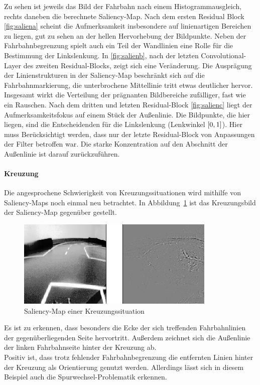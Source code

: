 Zu sehen ist jeweils das Bild der Fahrbahn nach einem Histogrammausgleich, rechts daneben die berechnete Saliency-Map. Nach dem ersten Residual Block \ref{fig:saliena} scheint die Aufmerksamkeit insbesondere auf linienartigen Bereichen zu liegen, gut zu sehen an der hellen Hervorhebung der Bildpunkte. Neben der Fahrbahnbegrenzung spielt auch ein Teil der Wandlinien eine Rolle für die Bestimmung der Linkslenkung. In \ref{fig:salienb}, nach der letzten Convolutional-Layer des zweiten Residual-Blocks, zeigt sich eine Veränderung. Die Ausprägung der Linienstrukturen in der Saliency-Map beschränkt sich auf die Fahrbahnmarkierung, die unterbrochene Mittellinie tritt etwas deutlicher hervor. Insgesamt wirkt die Verteilung der prägnanten Bildbereiche zufälliger, fast wie ein Rauschen.
Nach dem dritten und letzten Residual-Block \ref{fig:salienc} liegt der Aufmerksamkeitsfokus auf einem Stück der Außenlinie.  Die Bildpunkte, die hier liegen, sind die Entscheidenden für die Linkslenkung (Lenkwinkel $\interval{0}{1}$). Hier muss Berücksichtigt werden, dass nur der letzte Residual-Block von Anpassungen der Filter betroffen war. Die starke Konzentration auf den Abschnitt der Außenlinie ist darauf zurückzuführen.\\

\paragraph{Kreuzung}
Die angesprochene Schwierigkeit von Kreuzungssituationen wird mithilfe von Saliency-Maps noch einmal neu betrachtet. In Abbildung~\ref{img:kreuzung} ist das Kreuzungsbild der Saliency-Map gegenüber gestellt.

\begin{figure}[h]
	\centering
	\includegraphics[scale=1.3]{figures/Kreuzung.png}
	\caption{Saliency-Map einer Kreuzungssituation}
	\label{img:kreuzung}
\end{figure}

Es ist zu erkennen, dass besonders die Ecke der sich treffenden Fahrbahnlinien der gegenüberliegenden Seite hervortritt. Außerdem zeichnet sich die Außenlinie der linken Fahrbahnseite hinter der Kreuzung ab.\\
Positiv ist, dass trotz fehlender Fahrbahnbegrenzung die entfernten Linien hinter der Kreuzung als Orientierung genutzt werden. Allerdings lässt sich in diesem Beispiel auch die Spurwechsel-Problematik erkennen. 


